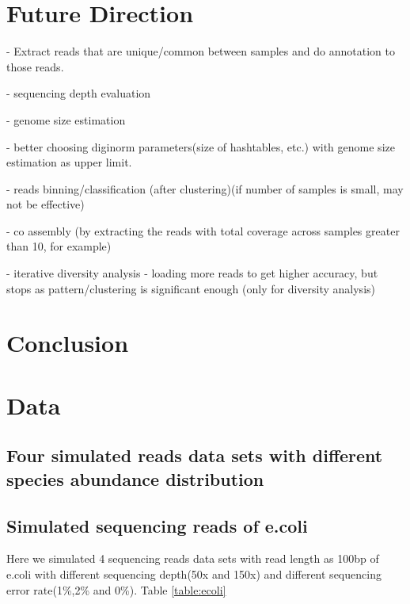 \documentclass{article}
\begin{document}
\section{Future Direction}

    - Extract reads that are unique/common between samples and do annotation to those reads.
    
    - sequencing depth evaluation
    
    - genome size estimation
    
    - better choosing diginorm parameters(size of hashtables, etc.) with genome size estimation as upper limit. 
    
    - reads binning/classification (after clustering)(if number of samples is small, may not be effective)
    
    - co assembly (by extracting the reads with total coverage across samples greater than 10, for example)
    
    - iterative diversity analysis - loading more reads to get higher accuracy, but  stops as pattern/clustering is significant enough
    (only for diversity analysis)
    
    
\section{Conclusion}





    

\section{Data}


\subsection{Four simulated reads data sets with different species abundance distribution}

\subsection{Simulated sequencing reads of e.coli}

Here we simulated 4 sequencing reads data sets with read length as 100bp of e.coli with different sequencing depth(50x and 150x) and different sequencing error rate(1\%,2\% and 0\%). Table \ref{table:ecoli}
\end{document}
